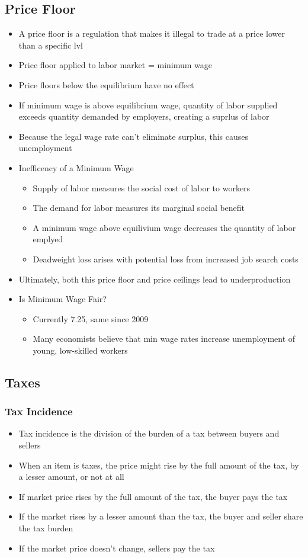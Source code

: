 \documentclass[11pt]{article}
\begin{document}
\subsection{Price Floor}
\label{sec:orgf140123}
\begin{itemize}
\item A price floor is a regulation that makes it illegal to trade at a price lower than a specific lvl
\item Price floor applied to labor market = minimum wage
\item Price floors below the equilibrium have no effect
\item If minimum wage is above equilibrium wage, quantity of labor supplied exceeds quantity demanded
by employers, creating a suprlus of labor
\item Because the legal wage rate can't eliminate surplus, this causes unemployment
\item Inefficency of a Minimum Wage
\begin{itemize}
\item Supply of labor measures the social cost of labor to workers
\item The demand for labor measures its marginal social benefit
\item A minimum wage above equilivium wage decreases the quantity of labor emplyed
\item Deadweight loss arises with potential loss from increased job search costs
\end{itemize}
\item Ultimately, both this price floor and price ceilings lead to underproduction
\item Is Minimum Wage Fair?
\begin{itemize}
\item Currently 7.25, same since 2009
\item Many economists believe that min wage rates increase unemployment of young, low-skilled workers
\end{itemize}
\end{itemize}
\subsection{Taxes}
\label{sec:org56c9dae}
\subsubsection{Tax Incidence}
\label{sec:orgc28b6d6}
\begin{itemize}
\item Tax incidence is the division of the burden of a tax between buyers and sellers
\item When an item is taxes, the price might rise by the full amount of the tax, by a lesser amount,
or not at all
\item If market price rises by the full amount of the tax, the buyer pays the tax
\item If the market rises by a lesser amount than the tax, the buyer and seller share the tax burden
\item If the market price doesn't change, sellers pay the tax
\end{itemize}
\end{document}
